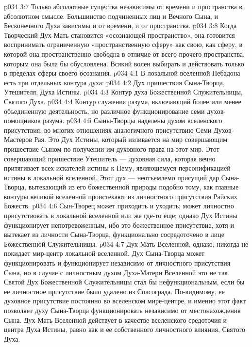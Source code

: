 \vs p034 3:7 \pc Только абсолютные существа независимы от времени и пространства в абсолютном смысле. Большинство подчиненных лиц и Вечного Сына, и Бесконечного Духа зависимы и от времени, и от пространства.
\vs p034 3:8 Когда Творческий Дух\hyp{}Мать становится «осознающей пространство», она готовится воспринимать ограниченную «пространственную сферу» как свою, как сферу, в которой она пространственно свободна в отличие от всего прочего пространства, которым она была бы обусловлена. Всякий волен выбирать и действовать только в пределах сферы своего осознания.
\vs p034 4:1 В локальной вселенной Небадона есть три отдельных контура духа:
\vs p034 4:2 \bibnobreakspace Дух пришествия Сына\hyp{}Творца, Утешителя, Духа Истины.
\vs p034 4:3 \bibnobreakspace Контур духа Божественной Служительницы, Святого Духа.
\vs p034 4:4 \bibnobreakspace Контур служения разума, включающий более или менее объединенную деятельность, но различное функционирование семи духов\hyp{}помощников разума.
\vs p034 4:5 \pc Сыны\hyp{}Творцы наделены духом вселенского присутствия, во многих отношениях аналогичного присутствию Семи Духов\hyp{}Мастеров Рая. Это Дух Истины, который изливается на мир совершающим пришествие Сыном по получении им духовного права на этот мир. Этот совершающий пришествие Утешитель --- духовная сила, которая вечно притягивает всех искателей истины к Нему, являющемуся персонификацией истины в локальной вселенной. Этот дух --- неотъемлемо присущий дар Сына\hyp{}Творца, вытекающий из его божественной природы подобно тому, как главные контуры великой вселенной проистекают из личностного присутствия Райских Божеств.
\vs p034 4:6 Сын\hyp{}Творец может приходить и уходить; может личностно присутствовать в локальной вселенной или же где\hyp{}то еще; однако Дух Истины функционирует непотревоженным, ибо это божественное присутствие, хотя и вытекает из личности Сына\hyp{}Творца, функционально сосредоточено в лице Божественной Служительницы.
\vs p034 4:7 Дух\hyp{}Мать Вселенной, однако, никогда не покидает мир\hyp{}центр локальной вселенной. Дух Сына\hyp{}Творца может функционировать и функционирует независимо от личностного присутствия Сына, но в случае с личностным духом Духа\hyp{}Матери Вселенной это не так. Святой Дух Божественной Служительницы стал бы нефункциональным, если бы ее личностное присутствие было удалено из Спасограда. По\hyp{}видимому, ее духовное присутствие постоянно во вселенском мире\hyp{}центре, и именно этот факт позволяет духу Сына\hyp{}Творца функционировать независимо от местонахождения Сына. Дух\hyp{}Мать Вселенной действует в качестве вселенского средоточия и центра Духа Истины, равно как и ее собственного личностного влияния, Святого Духа.
